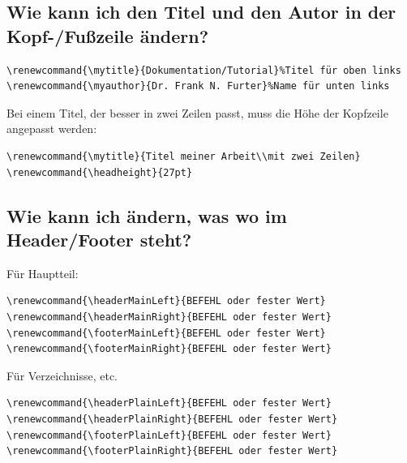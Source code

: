 \documentclass[12pt]{article}
\begin{document}
\subsection{Wie kann ich den Titel und den Autor in der Kopf-/Fußzeile ändern?}
\begin{verbatim}
\renewcommand{\mytitle}{Dokumentation/Tutorial}%Titel für oben links
\renewcommand{\myauthor}{Dr. Frank N. Furter}%Name für unten links
\end{verbatim}
Bei einem Titel, der besser in zwei Zeilen passt, muss die Höhe der Kopfzeile angepasst werden:
\begin{verbatim}
\renewcommand{\mytitle}{Titel meiner Arbeit\\mit zwei Zeilen}
\renewcommand{\headheight}{27pt}
\end{verbatim}

\subsection{Wie kann ich ändern, was wo im Header/Footer steht?}
Für Hauptteil:
\begin{verbatim}
\renewcommand{\headerMainLeft}{BEFEHL oder fester Wert}
\renewcommand{\headerMainRight}{BEFEHL oder fester Wert}
\renewcommand{\footerMainLeft}{BEFEHL oder fester Wert}
\renewcommand{\footerMainRight}{BEFEHL oder fester Wert}
\end{verbatim}
Für Verzeichnisse, etc.
\begin{verbatim}
\renewcommand{\headerPlainLeft}{BEFEHL oder fester Wert}
\renewcommand{\headerPlainRight}{BEFEHL oder fester Wert}
\renewcommand{\footerPlainLeft}{BEFEHL oder fester Wert}
\renewcommand{\footerPlainRight}{BEFEHL oder fester Wert}
\end{verbatim}
\end{document}
